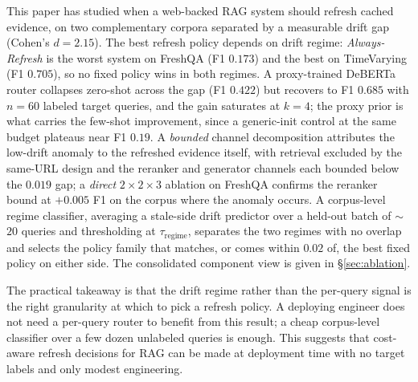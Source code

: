 \documentclass[pdflatex,sn-basic]{sn-jnl}
\begin{document}
This paper has studied when a web-backed RAG system should refresh cached evidence, on two complementary corpora separated by a measurable drift gap (Cohen's $d{=}2.15$). The best refresh policy depends on drift regime: \emph{Always-Refresh} is the worst system on FreshQA (F1 $0.173$) and the best on TimeVarying (F1 $0.705$), so no fixed policy wins in both regimes. A proxy-trained DeBERTa router collapses zero-shot across the gap (F1 $0.422$) but recovers to F1 $0.685$ with $n{=}60$ labeled target queries, and the gain saturates at $k{=}4$; the proxy prior is what carries the few-shot improvement, since a generic-init control at the same budget plateaus near F1 $0.19$. A \emph{bounded} channel decomposition attributes the low-drift anomaly to the refreshed evidence itself, with retrieval excluded by the same-URL design and the reranker and generator channels each bounded below the $0.019$ gap; a \emph{direct} $2 \times 2 \times 3$ ablation on FreshQA confirms the reranker bound at $+0.005$ F1 on the corpus where the anomaly occurs. A corpus-level regime classifier, averaging a stale-side drift predictor over a held-out batch of $\sim$$20$ queries and thresholding at $\tau_{\text{regime}}$, separates the two regimes with no overlap and selects the policy family that matches, or comes within $0.02$ of, the best fixed policy on either side. The consolidated component view is given in §\ref{sec:ablation}.

The practical takeaway is that the drift regime rather than the per-query signal is the right granularity at which to pick a refresh policy. A deploying engineer does not need a per-query router to benefit from this result; a cheap corpus-level classifier over a few dozen unlabeled queries is enough. This suggests that cost-aware refresh decisions for RAG can be made at deployment time with no target labels and only modest engineering.
\end{document}
